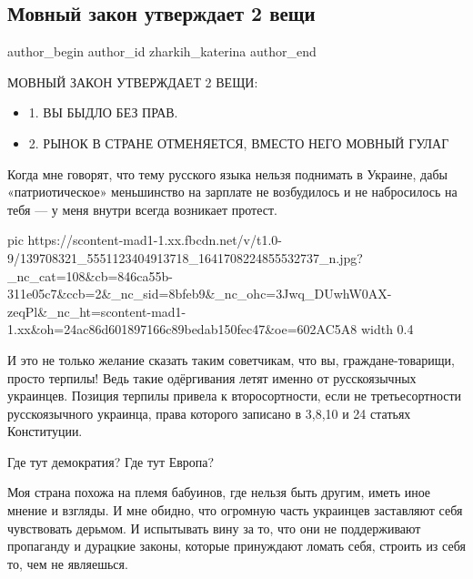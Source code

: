  
 
 
 
 
\subsection{Мовный закон утверждает 2 вещи}
\ifcmt
  author_begin
   author_id zharkih_katerina
  author_end
\fi


МОВНЫЙ ЗАКОН УТВЕРЖДАЕТ 2 ВЕЩИ:

\begin{itemize}
\item 1. ВЫ БЫДЛО БЕЗ ПРАВ. 
\item 2. РЫНОК В СТРАНЕ ОТМЕНЯЕТСЯ, ВМЕСТО НЕГО МОВНЫЙ ГУЛАГ 
\end{itemize}

Когда мне говорят, что тему русского языка нельзя поднимать в Украине, дабы
«патриотическое» меньшинство на зарплате не возбудилось и не набросилось на
тебя — у меня внутри всегда возникает протест. 

\ifcmt
  pic https://scontent-mad1-1.xx.fbcdn.net/v/t1.0-9/139708321_5551123404913718_1641708224855532737_n.jpg?_nc_cat=108&cb=846ca55b-311e05c7&ccb=2&_nc_sid=8bfeb9&_nc_ohc=3Jwq_DUwhW0AX-zeqPl&_nc_ht=scontent-mad1-1.xx&oh=24ac86d601897166c89bedab150fec47&oe=602AC5A8
  width 0.4
\fi


И это не только желание сказать таким советчикам, что вы, граждане-товарищи,
просто терпилы! Ведь такие одёргивания летят именно от русскоязычных украинцев.
Позиция терпилы привела к второсортности, если не третьесортности
русскоязычного украинца, права которого записано в 3,8,10 и 24 статьях
Конституции. 

Где тут демократия? Где тут Европа? 

Моя страна похожа на племя бабуинов, где нельзя быть другим, иметь иное мнение
и взгляды. И мне обидно, что огромную часть украинцев заставляют себя
чувствовать дерьмом. И испытывать вину за то, что они не поддерживают
пропаганду и дурацкие законы, которые принуждают ломать себя, строить из себя
то, чем не являешься. 

